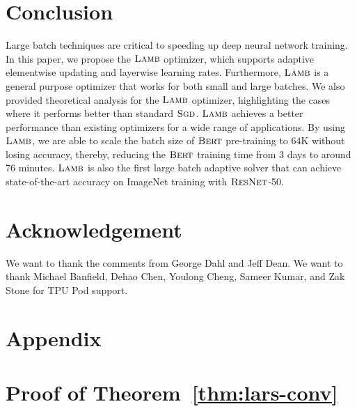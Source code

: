 \documentclass{article} \usepackage{iclr2020_conference,times}
\newcommand{\resnet}{\textsc{ResNet}}
\newcommand{\bert}{\textsc{Bert}\xspace}
\newcommand{\sgd}{\textsc{Sgd}\xspace}
\newcommand{\lamb}{\textsc{Lamb}}
\begin{document}
\section{Conclusion}
Large batch techniques are critical to speeding up deep neural network training. In this paper, we propose the $\lamb$ optimizer, which supports adaptive elementwise updating and layerwise learning rates. Furthermore, $\lamb$ is a general purpose optimizer that works for both small and large batches. We also provided theoretical analysis for the $\lamb$ optimizer, highlighting the cases where it performs better than standard $\sgd$. $\lamb$ achieves a better performance than existing optimizers for a wide range of applications.  By using $\lamb$, we are able to scale the batch size of $\bert$ pre-training to 64K without losing accuracy, thereby, reducing the $\bert$ training time from 3 days to around 76 minutes. $\lamb$ is also the first large batch adaptive solver that can achieve state-of-the-art accuracy on ImageNet training with $\resnet$-50. 
\vspace{-2mm}
\section{Acknowledgement}
\vspace*{-3mm}
We want to thank the comments from George Dahl and Jeff Dean.
We want to thank Michael Banfield, Dehao Chen, Youlong Cheng, Sameer Kumar, and Zak Stone for TPU Pod support.
%
 




\appendix
\section*{Appendix}

\section{Proof of Theorem~\ref{thm:lars-conv}}
\end{document}

